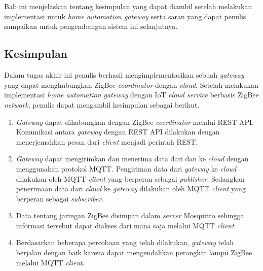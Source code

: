\chapter{\babEnam}

Bab ini menjelaskan tentang kesimpulan yang dapat diambil setelah melakukan implementasi untuk \textit{home automation gateway} serta saran  yang dapat penulis sampaikan untuk pengembangan sistem ini selanjutnya.

\section{Kesimpulan}



Dalam tugas akhir ini penulis berhasil mengimplementasikan sebuah \textit{gateway} yang dapat menghubungkan ZigBee \textit{coordinator} dengan \textit{cloud}. Setelah melakukan implementasi \textit{home automation gateway} dengan IoT \textit{cloud service} berbasis ZigBee \textit{network}, penulis dapat mengambil kesimpulan sebagai berikut.

\begin{enumerate}
\item \textit{Gateway} dapat dihubungkan dengan ZigBee \textit{coordinator} melalui REST API. Komunikasi antara \textit{gateway} dengan REST API dilakukan dengan menerjemahkan pesan dari \textit{client} menjadi perintah REST.

\item \textit{Gateway} dapat mengirimkan dan menerima data dari dan ke \textit{cloud} dengan menggunakan protokol MQTT. Pengiriman data dari \textit{gateway} ke \textit{cloud} dilakukan oleh MQTT \textit{client} yang berperan sebagai \textit{publisher}. Sedangkan penerimaan data dari \textit{cloud} ke \textit{gateway} dilakukan oleh MQTT \textit{client} yang berperan sebagai \textit{subscriber}.

\item Data tentang jaringan ZigBee disimpan dalam \textit{server} Mosquitto sehingga informasi tersebut dapat diakses dari mana saja melalui MQTT \textit{client}.

\item Berdasarkan beberapa percobaan yang telah dilakukan, \textit{gateway} telah berjalan dengan baik karena dapat mengendalikan perangkat lampu ZigBee melalui MQTT \textit{client}.

\end{enumerate}

